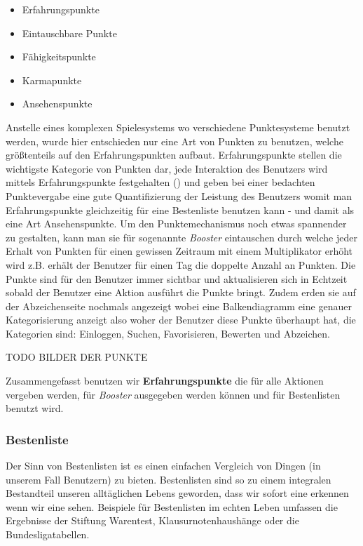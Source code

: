 \documentclass[12pt,twoside]{book}
\begin{document}
\begin{itemize}
	\item Erfahrungspunkte
    \item Eintauschbare Punkte
    \item Fähigkeitspunkte
    \item Karmapunkte
    \item Ansehenspunkte
\end{itemize}


Anstelle eines komplexen Spielesystems wo verschiedene Punktesysteme benutzt werden, wurde hier entschieden nur eine Art von Punkten zu benutzen,
welche größtenteils auf den Erfahrungspunkten aufbaut. Erfahrungspunkte stellen die wichtigste Kategorie von Punkten dar, jede Interaktion des Benutzers wird mittels Erfahrungspunkte festgehalten (\citep{zichermann2011gamification}) und geben bei einer bedachten Punktevergabe  eine gute Quantifizierung der Leistung des Benutzers womit man Erfahrungspunkte gleichzeitig für eine Bestenliste benutzen kann - und damit als eine Art Ansehenspunkte. Um den Punktemechanismus noch etwas spannender zu gestalten, kann man sie für sogenannte \textit{Booster} eintauschen durch welche jeder Erhalt von Punkten für einen gewissen Zeitraum mit einem Multiplikator erhöht wird z.B. erhält der Benutzer für einen Tag die doppelte Anzahl an Punkten.
Die Punkte sind für den Benutzer immer sichtbar und aktualisieren sich in Echtzeit sobald der Benutzer eine Aktion ausführt die Punkte bringt. Zudem erden sie auf der Abzeichenseite nochmals angezeigt wobei eine Balkendiagramm eine genauer Kategorisierung anzeigt also woher der Benutzer diese Punkte überhaupt hat, die Kategorien sind: Einloggen, Suchen, Favorisieren, Bewerten und Abzeichen.

TODO BILDER DER PUNKTE

Zusammengefasst benutzen wir \textbf{Erfahrungspunkte} die für alle Aktionen vergeben werden, für \textit{Booster} ausgegeben werden können und für Bestenlisten benutzt wird.

\subsubsection{Bestenliste}

Der Sinn von Bestenlisten ist es einen einfachen Vergleich von Dingen (in unserem Fall Benutzern) zu bieten. Bestenlisten sind so zu einem integralen Bestandteil unseren alltäglichen Lebens geworden, dass wir sofort eine erkennen wenn wir eine sehen. Beispiele für Bestenlisten im echten Leben umfassen die Ergebnisse der Stiftung Warentest, Klausurnotenhaushänge oder die Bundesligatabellen.
\end{document}
